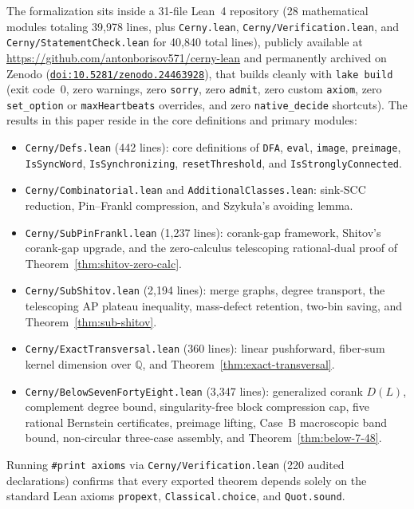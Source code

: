 \documentclass[11pt]{article}
\theoremstyle{definition}
\theoremstyle{remark}
\newcommand{\Q}{\mathbb{Q}}
\begin{document}
The formalization sits inside a 31-file Lean~4 repository (28 mathematical modules totaling 39,978 lines, plus \texttt{Cerny.lean}, \texttt{Cerny/Verification.lean}, and \texttt{Cerny/StatementCheck.lean} for 40,840 total lines), publicly available at \url{https://github.com/antonborisov571/cerny-lean} and permanently archived on Zenodo (\href{https://doi.org/10.5281/zenodo.24463928}{\texttt{doi:10.5281/zenodo.24463928}}), that builds cleanly with \texttt{lake build} (exit code~0, zero warnings, zero \texttt{sorry}, zero \texttt{admit}, zero custom \texttt{axiom}, zero \texttt{set\_option} or \texttt{maxHeartbeats} overrides, and zero \texttt{native\_decide} shortcuts). The results in this paper reside in the core definitions and primary modules:
\begin{itemize}[leftmargin=2em]
  \item \texttt{Cerny/Defs.lean} (442 lines): core definitions of \texttt{DFA}, \texttt{eval}, \texttt{image}, \texttt{preimage}, \texttt{IsSyncWord}, \texttt{IsSynchronizing}, \texttt{resetThreshold}, and \texttt{IsStronglyConnected}.
  \item \texttt{Cerny/Combinatorial.lean} and \texttt{AdditionalClasses.lean}: sink-SCC reduction, Pin--Frankl compression, and Szyku\l a's avoiding lemma.
  \item \texttt{Cerny/SubPinFrankl.lean} (1,237 lines): corank-gap framework, Shitov's corank-gap upgrade, and the zero-calculus telescoping rational-dual proof of Theorem~\ref{thm:shitov-zero-calc}.
  \item \texttt{Cerny/SubShitov.lean} (2,194 lines): merge graphs, degree transport, the telescoping AP plateau inequality, mass-defect retention, two-bin saving, and Theorem~\ref{thm:sub-shitov}.
  \item \texttt{Cerny/ExactTransversal.lean} (360 lines): linear pushforward, fiber-sum kernel dimension over $\Q$, and Theorem~\ref{thm:exact-transversal}.
  \item \texttt{Cerny/BelowSevenFortyEight.lean} (3,347 lines): generalized corank $D(L)$, complement degree bound, singularity-free block compression cap, five rational Bernstein certificates, preimage lifting, Case~B macroscopic band bound, non-circular three-case assembly, and Theorem~\ref{thm:below-7-48}.
\end{itemize}
Running \texttt{\#print axioms} via \texttt{Cerny/Verification.lean} (220 audited declarations) confirms that every exported theorem depends solely on the standard Lean axioms \texttt{propext}, \texttt{Classical.choice}, and \texttt{Quot.sound}.
\end{document}
